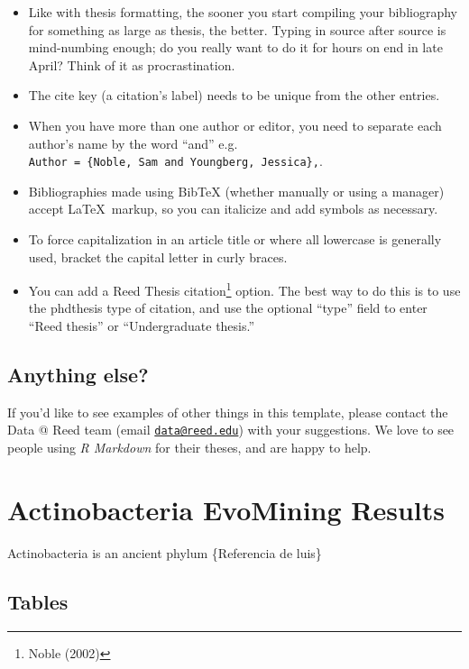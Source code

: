 \documentclass[12pt,twoside]{reedthesis}
\providecommand{\tightlist}{%
  \setlength{\itemsep}{0pt}\setlength{\parskip}{0pt}}
\begin{document}
  \begin{itemize}
  \tightlist
  \item
    Like with thesis formatting, the sooner you start compiling your
    bibliography for something as large as thesis, the better. Typing in
    source after source is mind-numbing enough; do you really want to do
    it for hours on end in late April? Think of it as procrastination.
  \item
    The cite key (a citation's label) needs to be unique from the other
    entries.
  \item
    When you have more than one author or editor, you need to separate
    each author's name by the word ``and'' e.g.
    \texttt{Author\ =\ \{Noble,\ Sam\ and\ Youngberg,\ Jessica\},}.
  \item
    Bibliographies made using BibTeX (whether manually or using a manager)
    accept \LaTeX~markup, so you can italicize and add symbols as
    necessary.
  \item
    To force capitalization in an article title or where all lowercase is
    generally used, bracket the capital letter in curly braces.
  \item
    You can add a Reed Thesis citation\footnote{Noble (2002)} option. The
    best way to do this is to use the phdthesis type of citation, and use
    the optional ``type'' field to enter ``Reed thesis'' or
    ``Undergraduate thesis.''
  \end{itemize}
  
  \section{Anything else?}\label{anything-else}
  
  If you'd like to see examples of other things in this template, please
  contact the Data @ Reed team (email
  \href{mailto:data@reed.edu}{\nolinkurl{data@reed.edu}}) with your
  suggestions. We love to see people using \emph{R Markdown} for their
  theses, and are happy to help.
  
  \hypertarget{refux5flabels}{\chapter{Actinobacteria EvoMining
  Results}\label{refux5flabels}}
  
  Actinobacteria is an ancient phylum \{Referencia de luis\}
  
  \section{Tables}\label{tables-1}
  
\end{document}
